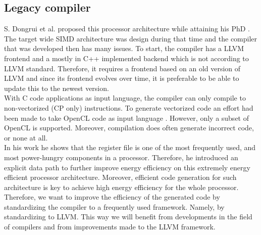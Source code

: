 

\subsection{Legacy compiler}\label{sec:legacy_comp}
S. Dongrui et al. proposed this processor architecture while attaining his PhD \cite{simd}. The target wide SIMD architecture was design during that time and the compiler that was developed then has many issues. To start, the compiler has a LLVM frontend and a mostly in C++ implemented backend which is not according to LLVM standard. Therefore, it requires a frontend based on an old version of LLVM and since its frontend evolves over time, it is preferable to be able to update this to the newest version. \\

With C code applications as input language, the compiler can only compile to non-vectorized (CP only) instructions. To generate vectorized code an effort had been made to take OpenCL code as input language \cite{dongrio2}. However, only a subset of OpenCL is supported. Moreover, compilation does often generate incorrect code, or none at all. \\


In his work he shows that the register file is one of the most frequently used, and most power-hungry components in a processor. Therefore, he introduced an explicit data path to further improve energy efficiency on this extremely energy efficient processor architecture. Moreover, efficient code generation for such architecture is key to achieve high energy efficiency for the whole processor. Therefore, we want to improve the efficiency of the generated code by standardizing the compiler to a frequently used framework. Namely, by standardizing to LLVM. This way we will benefit from developments in the field of compilers and from improvements made to the LLVM framework.

